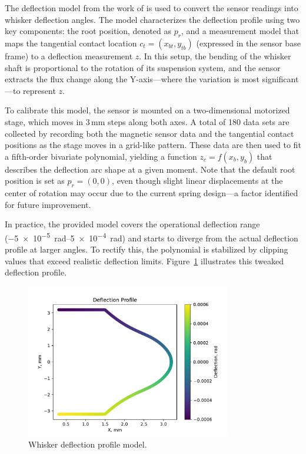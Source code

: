 The deflection model from the work of \textcite{dang2025whisker} is used to convert the sensor readings into whisker deflection angles.
The model characterizes the deflection profile using two key components: the root position, denoted as \(p_r\), and a measurement model that maps the tangential contact location \(c_t = (x_{bt}, y_{tb})\) (expressed in the sensor base frame) to a deflection measurement \(z\).
In this setup, the bending of the whisker shaft is proportional to the rotation of its suspension system, and the sensor extracts the flux change along the Y-axis—where the variation is most significant—to represent \(z\).

To calibrate this model, the sensor is mounted on a two-dimensional motorized stage, which moves in 3\,mm steps along both axes.
A total of 180 data sets are collected by recording both the magnetic sensor data and the tangential contact positions as the stage moves in a grid-like pattern.
These data are then used to fit a fifth-order bivariate polynomial, yielding a function \(z_c = f(x_b, y_b)\) that describes the deflection arc shape at a given moment.
Note that the default root position is set as \(p_r = (0,0)\), even though slight linear displacements at the center of rotation may occur due to the current spring design—a factor identified for future improvement.

In practice, the provided model covers the operational deflection range (\qtyrange{-5e-5}{5e-4}{\radian}) and starts to diverge from the actual deflection profile at larger angles.
To rectify this, the polynomial is stabilized by clipping values that exceed realistic deflection limits.
Figure~\ref{fig:deflection_profile} illustrates this tweaked deflection profile.

\begin{figure}[htb]
    \centering
    \includegraphics[width=0.8\textwidth]{figures/deflection_profile}
    \caption{Whisker deflection profile model.}
    \label{fig:deflection_profile}
\end{figure}
